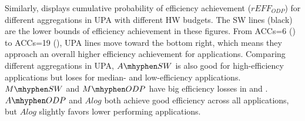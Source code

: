 Similarly,  displays cumulative probability of efficiency achievement ($rEFF_{ODP}$) for different aggregations in UPA with different HW budgets. The SW lines (black) are the lower bounds of efficiency achievement in these figures. 
From ACCs=6 () to ACCs=19 (), UPA lines move toward the bottom right, which means they approach an overall higher efficiency achievement for applications. Comparing different aggregations in UPA, $A\mhyphen SW$ is also good for high-efficiency applications but loses for median- and low-efficiency applications. 
$M\mhyphen SW$ and $M\mhyphen ODP$ have big efficiency losses in  and . 
$A\mhyphen ODP$ and $Alog$ both achieve good efficiency across all applications, but $Alog$ slightly favors lower performing applications. 
